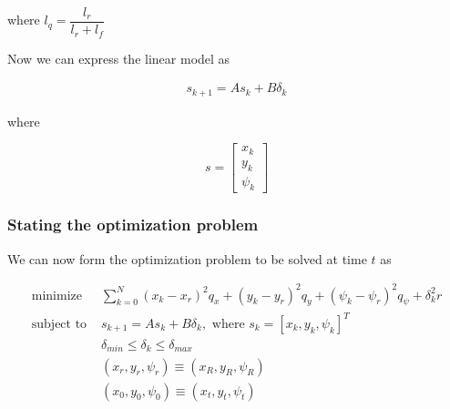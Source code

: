 where $l_q = \dfrac{l_r}{l_r + l_f}$




Now we can express the linear model as

\begin{align}
  s_{k+1} = A s_k + B \delta_k
\end{align}

where

\begin{equation}
  s=
  \begin{bmatrix}
    x_{k} \\
    y_{k} \\
    \psi_{k}
  \end{bmatrix}
\end{equation}


\subsubsection{Stating the optimization problem}

We can now form the optimization problem to be solved at time $t$ as

\begin{align}
  \text{minimize }    & \sum\limits_{k=0}^N (x_k-x_r)^2 q_x + (y_k-y_r)^2 q_y + (\psi_k-\psi_r)^2 q_{\psi} + \delta_k^2 r \\
  \text{subject to }  & s_{k+1} = A s_k + B \delta_k,\text{ where } s_k = [x_k, y_k, \psi_k]^T \\
                      & \delta_{min} \leq \delta_k \leq \delta_{max} \\
                      & (x_r, y_r, \psi_r) \equiv (x_R, y_R, \psi_R) \\
                      & (x_0, y_0, \psi_0) \equiv (x_t, y_t, \psi_t)
\end{align}
